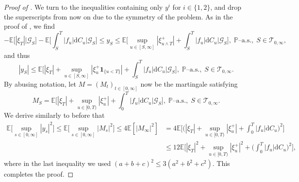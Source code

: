 \documentclass[10pt]{article} %
\newcommand\cG{\mathcal G}
\newcommand\cT{\mathcal T}
\def \E{\mathbb{E}}
\def \P{\mathbb{P}}
\newcommand{\1}{\mathbf{1}}
\def\d{\mathrm{d}}
\begin{document}
\begin{proof}[Proof of ]
	\medskip
	We turn to the inequalities containing only $y^i$ for $i \in \{1,2\}$, and drop the superscripts from now on due to the symmetry of the problem. As in the proof of , we find
	\begin{equation*}
		-\E\big[ |\xi_T| \big| \cG_S\big] - \E\bigg[\int_S^T|f_u|\d C_u\bigg|\cG_S\bigg] \leq y_S \leq \E\bigg[\sup_{u \in [S,\infty]}|\xi^+_{u \land T}| + \int_S^T |f_u|\d C_u \bigg| \cG_S\bigg], \; \text{$\P$--a.s.}, \; S \in \cT_{0,\infty},
	\end{equation*}
	and thus
	\begin{equation*}
		|y_S| \leq \E\bigg[|\xi_T| + \sup_{u \in [S,\infty]}|\xi^+_u \mathbf{1}_{\{u < T\}}| + \int_S^T |f_u|\d C_u \Bigg| \cG_S \bigg], \; \text{$\P$--a.s.}, \; S \in \cT_{0,\infty}.
	\end{equation*}
	By abusing notation, let $M = (M_t)_{t \in [0,\infty]}$ now be the martingale satisfying
	\begin{equation*}
		M_S = \E\bigg[|\xi_T| + \sup_{u \in [0,T)}|\xi^+_{u}| + \int_0^T |f_u|\d C_u \bigg| \cG_S \bigg], \; \text{$\P$--a.s.}, \; S \in \cT_{0,\infty}.
	\end{equation*}
	We derive similarly to before that
	\begin{align*}
		\E\bigg[\sup_{s \in [0,\infty]} |y_s|^2\bigg] \leq \E\bigg[\sup_{s \in [0,\infty]} |M_s|^2\bigg] \leq 4  \E[|M_\infty|^2] &= 4  \E\bigg[ \bigg(|\xi_T| + \sup_{u \in [0,T)}|\xi^+_u| + \int_0^T | f_u| \d C_u\bigg)^2 \bigg] \\
		&\leq 12  \E\bigg[ |\xi_T|^2 + \sup_{u \in [0,T)}|\xi^+_u|^2 + \bigg(\int_0^T | f_u| \d C_u\bigg)^2 \bigg],
	\end{align*}
	where in the last inequality we used $(a+b+c)^2 \leq 3(a^2+b^2+c^2)$. This completes the proof.
\end{proof}
\end{document}
